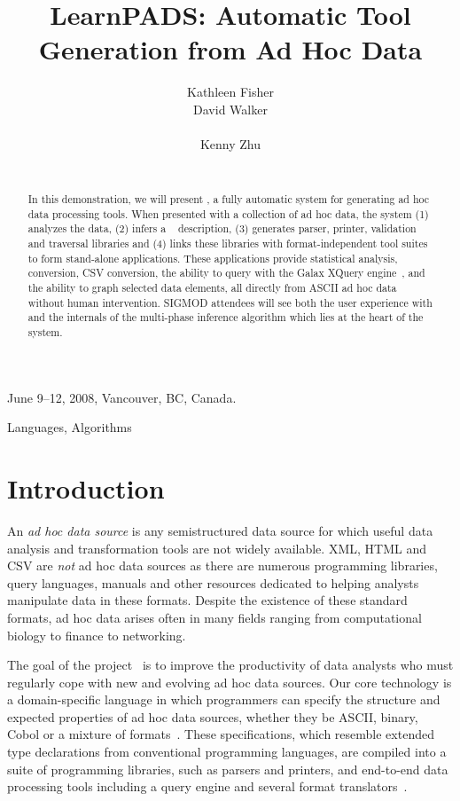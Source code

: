 \documentclass[preprint]{sig-alternate-sigmod08}
\title{LearnPADS: Automatic Tool Generation from Ad Hoc Data}
\author{\alignauthor Kathleen Fisher \\
\affaddr{AT\&T Labs Research}
\email{kfisher@research.att.com}
\alignauthor David Walker \\
\affaddr{Princeton University}\\
\email{dpw@cs.princeton.edu}
\alignauthor Kenny Zhu \\
\affaddr{Princeton University}\\
\email{kzhu@cs.princeton.edu}
}
\begin{document}
 {June 9--12, 2008, Vancouver, BC, Canada.} 
\maketitle
\begin{abstract}
In this demonstration, we will present \learnpads, 
a fully automatic system for generating
ad hoc data processing tools.  When presented with a collection of
ad hoc data, the system (1) analyzes the data, (2) infers a 
\pads{}~\cite{fisher+:pads,fisher+:popl06} description, (3) 
generates parser, printer, validation and traversal libraries and (4)
links these libraries with format-independent  
tool suites to form stand-alone applications.  These applications provide
statistical analysis, \xml{}
conversion, CSV conversion, the ability to query with the 
Galax XQuery engine~\cite{fernandez+:padx}, and the ability to 
graph selected data elements, all
directly from ASCII ad hoc data without human intervention.
SIGMOD attendees will see both the user experience with \learnpads{} and
the internals of the multi-phase inference algorithm which lies at
the heart of the system. 
\end{abstract}


\terms
Languages, Algorithms

\section{Introduction}
An {\em ad hoc data source} is any semistructured data source
for which useful data analysis and transformation tools
are not widely available. XML, HTML and CSV are {\em not} 
ad hoc data sources as there are numerous programming libraries,
query languages, manuals and other resources dedicated to
helping analysts manipulate data in these formats.
Despite the existence of these standard formats, ad hoc data arises
often in many fields ranging from computational biology to finance to networking.

The goal of the \pads{} project~\cite{padsweb} is to improve the
productivity of data analysts who must regularly cope with new and evolving
ad hoc data sources.  Our core technology is a
domain-specific language in which programmers can specify the
structure and expected properties of ad hoc data sources, whether they
be ASCII, binary, Cobol or a mixture of formats~\cite{fisher+:pads,fisher+:popl06}.  These
specifications, which resemble extended type declarations from
conventional programming languages, are compiled into a suite of
programming libraries, such as parsers and printers, and 
end-to-end data processing tools including a query engine 
and several format translators~\cite{fernandez+:padl,fernandez+:padx,mandelbaum+:pads-ml}.
\end{document}
